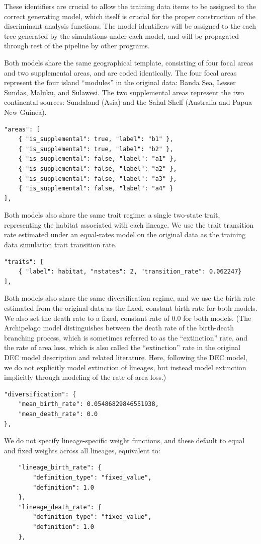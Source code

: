 \documentclass[11pt,openany]{memoir} %
\begin{document}
These identifiers are crucial to allow the training data items to be assigned to the correct generating model, which itself is crucial for the proper construction of the discriminant analysis functions.
The model identifiers will be assigned to the each tree generated by the simulations under each model, and will be propagated through rest of the pipeline by other programs.

Both models share the same geographical template, consisting of four focal areas and two supplemental areas, and are coded identically.
The four focal areas represent the four island ``modules'' in the original data: Banda Sea, Lesser Sundas, Maluku, and Sulawesi.
The two supplemental areas represent the two continental sources: Sundaland (Asia) and the Sahul Shelf (Australia and Papua New Guinea).
\begin{lstlisting}
"areas": [
    { "is_supplemental": true, "label": "b1" },
    { "is_supplemental": true, "label": "b2" },
    { "is_supplemental": false, "label": "a1" },
    { "is_supplemental": false, "label": "a2" },
    { "is_supplemental": false, "label": "a3" },
    { "is_supplemental": false, "label": "a4" }
], \end{lstlisting}

Both models also share the same trait regime: a single two-state trait, representing the habitat associated with each lineage.
We use the trait transition rate estimated under an equal-rates model on the original data as the training data simulation trait transition rate.
\begin{lstlisting}
"traits": [
    { "label": habitat, "nstates": 2, "transition_rate": 0.062247}
],
\end{lstlisting}
Both models also share the same diversification regime, and we use the birth rate estimated from the original data as the fixed, constant birth rate for both models.
We also set the death rate to a fixed, constant rate of $0.0$ for both models.
(The Archipelago model distinguishes between the death rate of the birth-death branching process, which is sometimes referred to as the ``extinction'' rate, and the rate of area loss, which is also called the ``extinction'' rate in the original DEC model description and related literature.
Here, following the DEC model, we do not explicitly model extinction of lineages, but instead model extinction implicitly through modeling of the rate of area loss.)
\begin{lstlisting}
"diversification": {
    "mean_birth_rate": 0.05486829846551938,
    "mean_death_rate": 0.0
},\end{lstlisting}
We do not specify lineage-specific weight functions, and these default to equal and fixed weights across all lineages, equivalent to:
\begin{lstlisting}
    "lineage_birth_rate": {
        "definition_type": "fixed_value",
        "definition": 1.0
    },
    "lineage_death_rate": {
        "definition_type": "fixed_value",
        "definition": 1.0
    },\end{lstlisting}
\end{document}
